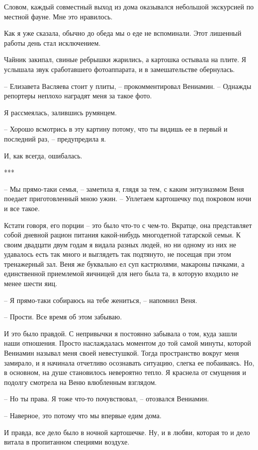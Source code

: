 \documentclass[
]{book}
\begin{document}
Словом, каждый совместный выход из дома оказывался небольшой экскурсией по местной фауне. Мне это нравилось.

Как я уже сказала, обычно до обеда мы о еде не вспоминали. Этот лишенный работы день стал исключением.

Чайник закипал, свиные ребрышки жарились, а картошка остывала на плите. Я услышала звук сработавшего фотоаппарата, и в замешательстве обернулась.

-- Елизавета Васляева стоит у плиты, -- прокомментировал Вениамин. -- Однажды репортеры неплохо наградят меня за такое фото.

Я рассмеялась, залившись румянцем.

-- Хорошо всмотрись в эту картину потому, что ты видишь ее в первый и последний раз, -- предупредила я.

И, как всегда, ошибалась.

***

-- Мы прямо-таки семья, -- заметила я, глядя за тем, с каким энтузиазмом Веня поедает приготовленный мною ужин. -- Уплетаем картошечку под покровом ночи и все такое.

Кстати говоря, его порции -- это было что-то с чем-то. Вкратце, она представляет собой дневной рацион питания какой-нибудь многодетной татарской семьи. К своим двадцати двум годам я видала разных людей, но ни одному из них не удавалось есть так много и выглядеть так подтянуто, не посещая при этом тренажерный зал. Веня же буквально ел суп кастрюлями, макароны пачками, а единственной приемлемой яичницей для него была та, в которую входило не менее шести яиц.

-- Я прямо-таки собираюсь на тебе жениться, -- напомнил Веня.

-- Прости. Все время об этом забываю.

И это было правдой. С непривычки я постоянно забывала о том, куда зашли наши отношения. Просто наслаждалась моментом до той самой минуты, которой Вениамин называл меня своей невестушкой. Тогда пространство вокруг меня замирало, и я начинала отчетливо осознавать ситуацию, слегка ее побаиваясь. Но, в основном, на душе становилось невероятно тепло. Я краснела от смущения и подолгу смотрела на Веню влюбленным взглядом.

-- Но ты права. Я тоже что-то почувствовал, -- отозвался Вениамин.

-- Наверное, это потому что мы впервые едим дома.

И правда, все дело было в ночной картошечке. Ну, и в любви, которая то и дело витала в пропитанном специями воздухе.
\end{document}
